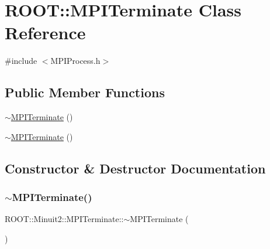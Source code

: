\hypertarget{classROOT_1_1Minuit2_1_1MPITerminate}{}\section{R\+O\+OT\+:\+:M\+P\+I\+Terminate Class Reference}
\label{classROOT_1_1Minuit2_1_1MPITerminate}


{\ttfamily \#include $<$M\+P\+I\+Process.\+h$>$}

\subsection*{Public Member Functions}
\begin{DoxyCompactItemize}
\item 
\mbox{\hyperlink{classROOT_1_1Minuit2_1_1MPITerminate_a3a0e732a5e0112404bfdd195d7826c98}{$\sim$\+M\+P\+I\+Terminate}} ()
\item 
\mbox{\hyperlink{classROOT_1_1Minuit2_1_1MPITerminate_a3a0e732a5e0112404bfdd195d7826c98}{$\sim$\+M\+P\+I\+Terminate}} ()
\end{DoxyCompactItemize}


\subsection{Constructor \& Destructor Documentation}
\mbox{\label{classROOT_1_1Minuit2_1_1MPITerminate_a3a0e732a5e0112404bfdd195d7826c98}} 
\subsubsection{\texorpdfstring{$\sim$MPITerminate()}{~MPITerminate()}\hspace{0.1cm}{\footnotesize\ttfamily [1/2]}}
{\footnotesize\ttfamily R\+O\+O\+T\+::\+Minuit2\+::\+M\+P\+I\+Terminate\+::$\sim$\+M\+P\+I\+Terminate (\begin{DoxyParamCaption}{ }\end{DoxyParamCaption})\hspace{0.3cm}{\ttfamily [inline]}}

\mbox{\label{classROOT_1_1Minuit2_1_1MPITerminate_a3a0e732a5e0112404bfdd195d7826c98}} 
